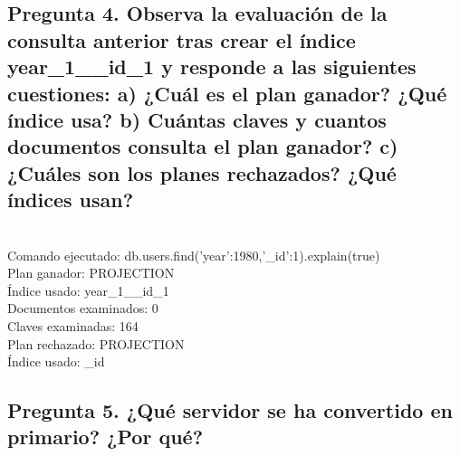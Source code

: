 \documentclass{article}
\begin{document}
    \subsection{Pregunta 4. Observa la evaluación de la consulta anterior tras crear el índice year_1__id_1 y responde a las siguientes cuestiones: a) ¿Cuál es el plan ganador? ¿Qué índice usa? b) Cuántas claves y cuantos documentos consulta el plan ganador? c) ¿Cuáles son los planes rechazados? ¿Qué índices usan?} \\
    Comando ejecutado: db.users.find({'year':1980},{'_id':1}).explain(true) \\
    Plan ganador: PROJECTION \\
    Índice usado: year_1__id_1 \\
    Documentos examinados: 0 \\
    Claves examinadas: 164 \\
    Plan rechazado: PROJECTION \\
    Índice usado: _id \\
   \subsection{Pregunta 5. ¿Qué servidor se ha convertido en primario? ¿Por qué?} \\
     
\end{document}
